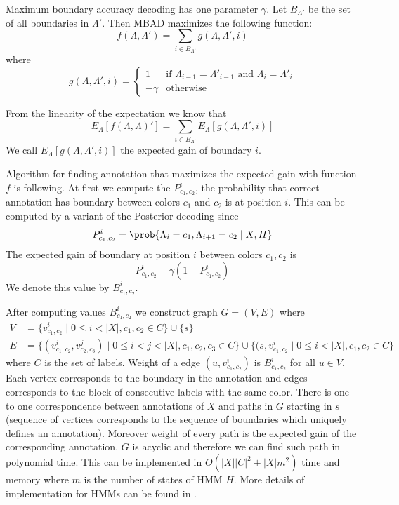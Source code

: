 Maximum boundary accuracy decoding has one parameter $\gamma$. Let $B_{\Lambda'}$ be the
set of all boundaries in $\Lambda'$. Then MBAD maximizes the following function:
\begin{equation}
f(\Lambda,\Lambda')=\sum_{i\in B_{\Lambda'}}g(\Lambda,\Lambda',i)
\end{equation}
where 
\begin{equation}
g(\Lambda,\Lambda',i)=
\begin{cases}
1 & \text{if $\Lambda_{i-1}=\Lambda'_{i-1}$ and $\Lambda_{i}=\Lambda'_{i}$}\\
-\gamma& \text{otherwise}
\end{cases}
\end{equation}

From the linearity of the expectation we know that
\[E_{\Lambda}[f(\Lambda,\Lambda)']=\sum_{i\in
B_{\Lambda'}}E_{\Lambda}[g(\Lambda,\Lambda',i)]\] We call
$E_{\Lambda}[g(\Lambda,\Lambda',i)]$ the expected gain of boundary $i$.


Algorithm for finding annotation that maximizes the expected gain with function $f$
is following. At first we compute the $P^i_{c_1,c_2}$, the probability that correct annotation
has boundary between colors $c_1$ and $c_2$ is at position $i$. This can be
computed by a variant of the Posterior decoding
since 
\[P_{c_1,c_2}^i=\prob{\Lambda_i=c_1,\Lambda_{i+1}=c_2\mid X,H}\]  
  The expected gain of
boundary at position $i$ between colors $c_1,c_2$  is 
\[P^i_{c_1,c_2}-\gamma (1-P^i_{c_1,c_2})\]
We denote this value by  $B^i_{c_1,c_2}$.

After computing values $B^i_{c_1,c_2}$ we construct graph $G=(V,E)$ where
\begin{align*}
V&=\{v^i_{c_1,c_2}\mid 0\leq i<|X|,c_1,c_2\in C\}\cup\{s\}\\
E&=\{(v^i_{c_1,c_2},v^j_{c_2,c_3})\mid 0\leq i<j< |X|, c_1,c_2,c_3\in C
\}\cup\{(s,v^i_{c_1,c_2}\mid 0\leq i< |X|, c_1,c_2\in C\} 
\end{align*}
where $C$ is the set
of labels. Weight of a edge $(u,v^i_{c_1,c_2})$ is $B^i_{c_1,c_2}$ for all $u\in
V$. Each vertex corresponds to the boundary in the annotation and edges
corresponds to the  block of consecutive labels with the same
color.
There is one to one correspondence between annotations of $X$ and paths in
$G$ starting in $s$ (sequence of vertices corresponds to the sequence of
boundaries which uniquely defines an annotation). Moreover weight of every path
is the expected gain of
the corresponding annotation. $G$ is acyclic and therefore we can find such path in
polynomial time. This can be implemented in $O(|X||C|^2+|X|m^2)$ time and memory
where $m$ is the number of states of HMM $H$. More details of implementation
for HMMs can be found in
\cite{Nanasi2010mgr}.

